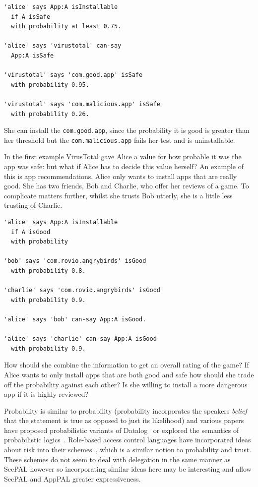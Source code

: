 \documentclass[thesis.tex]{subfiles}
\begin{document}
\begin{lstlisting}
'alice' says App:A isInstallable
  if A isSafe
  with probability at least 0.75.

'alice' says 'virustotal' can-say
  App:A isSafe

'virustotal' says 'com.good.app' isSafe
  with probability 0.95.

'virustotal' says 'com.malicious.app' isSafe
  with probability 0.26.
\end{lstlisting}

She can install the \texttt{com.good.app}, since the probability it is good is
greater than her threshold but the \texttt{com.malicious.app} fails her test and
is uninstallable. 

In the first example VirusTotal gave Alice a value for how probable it was the
app was safe: but what if Alice has to decide this value herself? An example of
this is app recommendations. Alice only wants to install apps that are really
good. She has two friends, Bob and Charlie, who offer her reviews of a game. To
complicate matters further, whilst she trusts Bob utterly, she is a little less
trusting of Charlie.

\begin{lstlisting}
'alice' says App:A isInstallable
  if A isGood
  with probability

'bob' says 'com.rovio.angrybirds' isGood
  with probability 0.8.

'charlie' says 'com.rovio.angrybirds' isGood
  with probability 0.9.

'alice' says 'bob' can-say App:A isGood.

'alice' says 'charlie' can-say App:A isGood
  with probability 0.9.
\end{lstlisting}

How should she combine the information to get an overall rating of the game? If
Alice wants to only install apps that are both good and safe how should she
trade off the probability against each other? Is she willing to install a more
dangerous app if it is highly reviewed?

Probability is similar to probability (probability incorporates the speakers
\emph{belief} that the statement is true as opposed to just its likelihood) and
various papers have proposed probabilistic variants of
Datalog~\cite{fuhr_probabilistic_1995} or explored the semantics of
probabilistic logics~\cite{halpern_analysis_1990}. Role-based access control
languages have incorporated ideas about risk into their
schemes~\cite{josang_analysing_2004,dimmock_using_2004,salim_approach_2011},
which is a similar notion to probability and trust. These schemes do not seem
to deal with delegation in the same manner as SecPAL however so incorporating
similar ideas here may be interesting and allow SecPAL and AppPAL greater
expressiveness.
\end{document}
